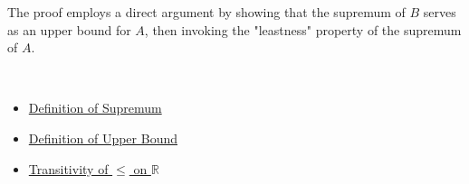 \begin{remark*}
The proof employs a direct argument by showing that the supremum of $B$ serves as an upper bound for $A$, then invoking the "leastness" property of the supremum of $A$.
\end{remark*}

\begin{remark*}[Dependencies]~\\
\begin{itemize}
  \item \hyperref[def:supremum]{Definition of Supremum}
  \item \hyperref[def:upper-bound]{Definition of Upper Bound}
  \item \hyperref[ax:transitivity-of-order]{Transitivity of $\le$ on $\mathbb{R}$}
\end{itemize}
\end{remark*}

\clearpage
